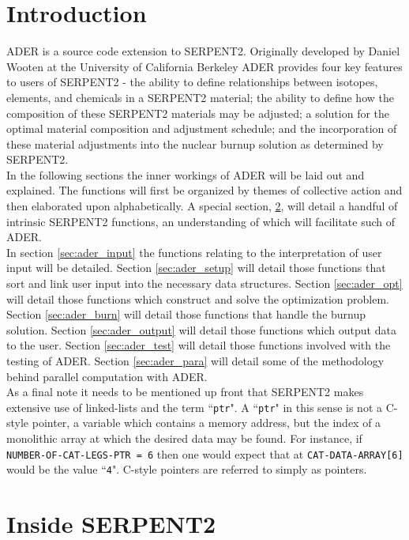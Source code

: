 \documentclass{article}
\begin{document}
\section{Introduction}\label{sec:intro}
ADER is a source code extension to SERPENT2. Originally developed by Daniel 
Wooten at the University of California Berkeley ADER provides four key features
to users of SERPENT2 - the ability to define relationships between isotopes,
elements, and chemicals in a SERPENT2 material; the ability to define how
the composition of these SERPENT2 materials may be adjusted; a solution for the
optimal material composition and adjustment schedule; and the incorporation of
these material adjustments into the nuclear burnup solution as determined by
SERPENT2.
\\
In the following sections the inner workings of ADER will be laid out and
explained. The functions will first be organized by themes of collective
action and then elaborated upon alphabetically. A special section, 
\ref{sec:serpent_funs}, will detail a handful of intrinsic SERPENT2 functions,
an understanding of which will facilitate such of ADER.
\\
In section \ref{sec:ader_input} the functions relating to the interpretation
of user input will be detailed. Section \ref{sec:ader_setup} will detail those
functions that sort and link user input into the necessary data structures.
Section \ref{sec:ader_opt} will detail those functions which construct and
solve the optimization problem. Section \ref{sec:ader_burn} will detail those
functions that handle the burnup solution. Section \ref{sec:ader_output} will
detail those functions which output data to the user. Section 
\ref{sec:ader_test} will detail those functions involved with the testing of
ADER. Section \ref{sec:ader_para} will detail some of the methodology
behind parallel computation with ADER.\\
As a final note it needs to be mentioned up front that SERPENT2 makes extensive
use of linked-lists and the term ``\texttt{ptr}". A ``\texttt{ptr}" in this
sense is not a C-style pointer, a variable which contains a memory address, but
the index of a monolithic array at which the desired data may be found. For
instance, if \texttt{NUMBER-OF-CAT-LEGS-PTR = 6} then one would 
expect that at \texttt{CAT-DATA-ARRAY[6]} would be the value ``\texttt{4}".
C-style pointers are referred to simply as pointers.\\

\section{Inside SERPENT2}\label{sec:serpent_funs}

\end{document}
